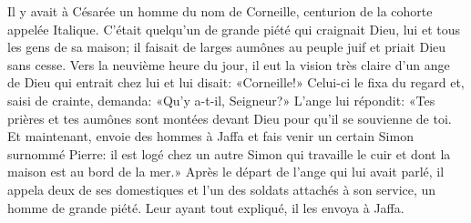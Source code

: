 Il y avait à Césarée un homme du nom de Corneille,
	centurion de la cohorte appelée Italique.
C’était quelqu’un de grande piété qui craignait Dieu,
	lui et tous les gens de sa maison;
	il faisait de larges aumônes au peuple juif et priait Dieu sans cesse.
Vers la neuvième heure du jour,
	il eut la vision très claire d’un ange de Dieu qui entrait chez lui
	et lui disait: «Corneille!»
Celui-ci le fixa du regard et, saisi de crainte, demanda:
	«Qu’y a-t-il, Seigneur?»
L’ange lui répondit: «Tes prières et tes aumônes sont montées devant Dieu
	pour qu’il se souvienne de toi.
Et maintenant, envoie des hommes à Jaffa
	et fais venir un certain Simon surnommé Pierre:
	il est logé chez un autre Simon qui travaille le cuir
	et dont la maison est au bord de la mer.»
Après le départ de l’ange qui lui avait parlé,
	il appela deux de ses domestiques
	et l’un des soldats attachés à son service, un homme de grande piété.
Leur ayant tout expliqué, il les envoya à Jaffa.
